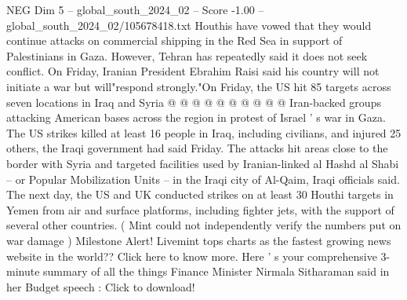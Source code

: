 \begin{textsample}{NEG Dim 5 – global\_south\_2024\_02 – Score -1.00 – global\_south\_2024\_02/105678418.txt}
Houthis have vowed that they would continue attacks on commercial shipping in the Red Sea in support of Palestinians in Gaza.
However, Tehran has repeatedly said it does not seek conflict.
On Friday, Iranian President Ebrahim Raisi said his country will not initiate a war but will"respond strongly."On Friday, the US hit 85 targets across seven locations in Iraq and Syria @ @ @ @ @ @ @ @ @ @ Iran-backed groups attacking American bases across the region in protest of Israel ' s war in Gaza.
The US strikes killed at least 16 people in Iraq, including civilians, and injured 25 others, the Iraqi government had said Friday.
The attacks hit areas close to the border with Syria and targeted facilities used by Iranian-linked al Hashd al Shabi -- or Popular Mobilization Units -- in the Iraqi city of Al-Qaim, Iraqi officials said.
The next day, the US and UK conducted strikes on at least 30 Houthi targets in Yemen from air and surface platforms, including fighter jets, with the support of several other countries. ( Mint could not independently verify the numbers put on war damage ) Milestone Alert!
Livemint tops charts as the fastest growing news website in the world??
Click here to know more.
Here ' s your comprehensive 3-minute summary of all the things Finance Minister Nirmala Sitharaman said in her Budget speech : Click to download!

\end{textsample}
